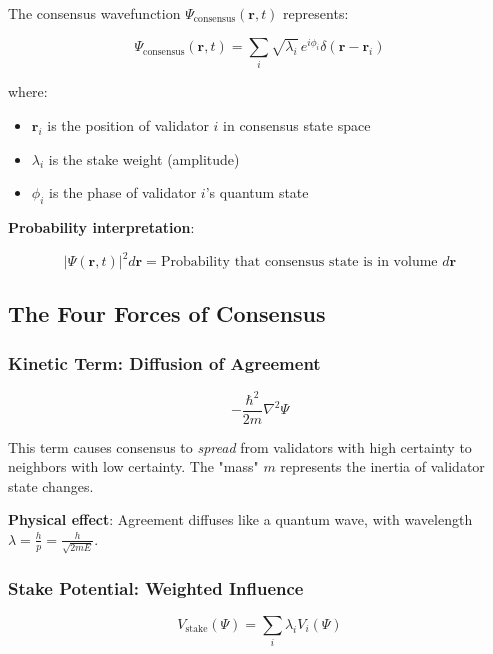 \documentclass[11pt,a4paper,twoside]{article}
\begin{document}
The consensus wavefunction $\Psi_{\text{consensus}}(\mathbf{r}, t)$ represents:

\begin{equation}
\Psi_{\text{consensus}}(\mathbf{r}, t) = \sum_i \sqrt{\lambda_i} \, e^{i\phi_i} \delta(\mathbf{r} - \mathbf{r}_i)
\end{equation}

where:
\begin{itemize}
    \item $\mathbf{r}_i$ is the position of validator $i$ in consensus state space
    \item $\lambda_i$ is the stake weight (amplitude)
    \item $\phi_i$ is the phase of validator $i$'s quantum state
\end{itemize}

\textbf{Probability interpretation}:

\begin{equation}
|\Psi(\mathbf{r}, t)|^2 d\mathbf{r} = \text{Probability that consensus state is in volume } d\mathbf{r}
\end{equation}

\subsection{The Four Forces of Consensus}

\subsubsection{Kinetic Term: Diffusion of Agreement}

\begin{equation}
-\frac{\hbar^2}{2m}\nabla^2\Psi
\end{equation}

This term causes consensus to \textit{spread} from validators with high certainty to neighbors with low certainty. The "mass" $m$ represents the inertia of validator state changes.

\textbf{Physical effect}: Agreement diffuses like a quantum wave, with wavelength $\lambda = \frac{h}{p} = \frac{h}{\sqrt{2mE}}$.

\subsubsection{Stake Potential: Weighted Influence}

\begin{equation}
V_{\text{stake}}(\Psi) = \sum_i \lambda_i V_i(\Psi)
\end{equation}
\end{document}
